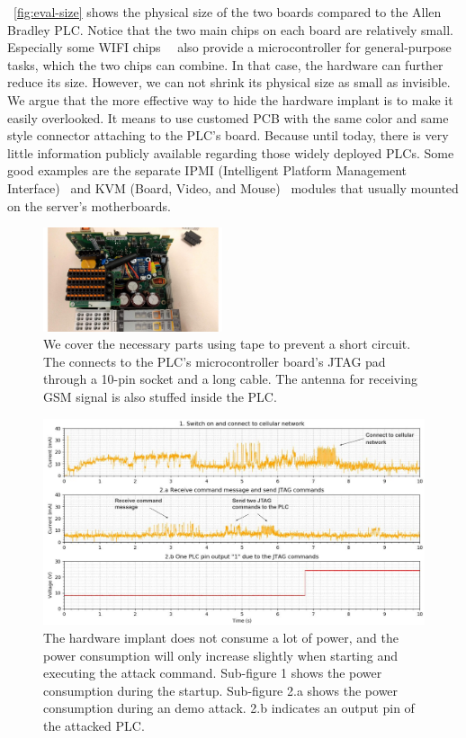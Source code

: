 ~\autoref{fig:eval-size} shows the physical size of the two boards compared to the Allen Bradley PLC. Notice that the two main chips on each board are relatively small. Especially some WIFI chips~\cite{babiuch2019using}~\cite{artenstein2017broadpwn} also provide a microcontroller for general-purpose tasks, which the two chips can combine.  In that case, the hardware can further reduce its size. However, we can not shrink its physical size as small as invisible.  We argue that the more effective way to hide the hardware implant is to make it easily overlooked. It means to use customed PCB with the same color and same style connector attaching to the PLC's board. Because until today, there is very little information publicly available regarding those widely deployed PLCs.  Some good examples are the separate IPMI (Intelligent Platform Management Interface)~\cite{slaight2003using} and KVM (Board, Video, and Mouse)~\cite{kedziorek2007hpc} modules that usually mounted on the server's motherboards.

\begin{figure}[h]
	\includegraphics[width=0.47\textwidth]{figures/eval-a}
	\centering
	\caption{We cover the necessary parts using tape to prevent a short circuit. The \name connects to the PLC's microcontroller board's JTAG pad through a 10-pin socket and a long cable. The antenna for receiving GSM signal is also stuffed inside the PLC.}
	\label{fig:eval-a}
\end{figure}

\begin{figure}[t]
	\includegraphics[width=\textwidth]{figures/current}
	\centering
	\caption{The hardware implant does not consume a lot of power, and the power consumption will only increase slightly when starting and executing the attack command. Sub-figure 1 shows the power consumption during the startup. Sub-figure 2.a shows the power consumption during an demo attack. 2.b indicates an output pin of the attacked PLC. }
	\label{fig:current}
\end{figure}

